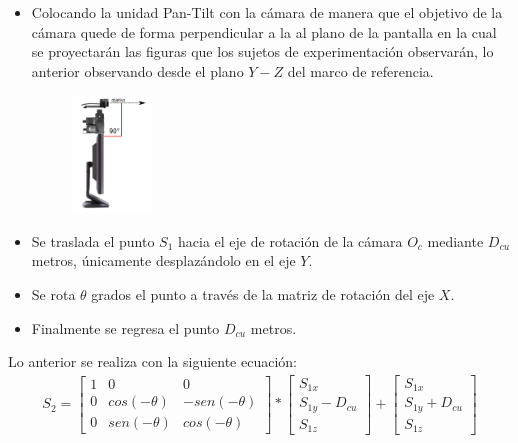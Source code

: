       \begin{itemize}
      	\item Colocando la unidad Pan-Tilt con la cámara de manera que el objetivo de la cámara quede de forma perpendicular a la al plano de la pantalla en la cual se proyectarán las figuras que los sujetos de experimentación observarán, lo anterior observando desde el plano $Y-Z$ del marco de referencia.
       \begin{figure}[htbp]
       	\centering
       	\includegraphics[width=0.2\textwidth]{./pictures/pantilt2}
       	\caption{}\label{fig: figura}
       	\label{pantilt2}
       \end{figure}
      	
      	\item Se traslada el punto $S_1$ hacia el eje de rotación de la cámara $O_c$ mediante $D_{cu}$ metros, únicamente desplazándolo en el eje $Y$.
      	\item Se rota $\theta$ grados el punto a través de la matriz de rotación del eje $X$.
      	\item Finalmente se regresa el punto $D_{cu}$ metros.
      \end{itemize}
	Lo anterior se realiza con la siguiente ecuación:
	        \begin{eqnarray}
	        S_2=
	        \begin{bmatrix}
	        1 & 0 & 0\\
	        0 & cos(-\theta) & -sen(-\theta)\\
	        0 & sen(-\theta) & cos(-\theta)
	        \end{bmatrix}*\begin{bmatrix}S_{1x}\\
	         S_{1y}-D_{cu}\\
	          S_{1z}
	        \end{bmatrix}+\begin{bmatrix}S_{1x}\\
	        S_{1y}+D_{cu}\\
	        S_{1z}
	        \end{bmatrix}
	        \end{eqnarray}

